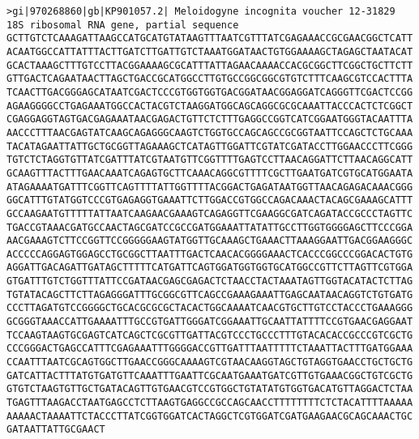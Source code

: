 \documentclass[11pt]{article}
\begin{document}
\begin{Verbatim}[commandchars=\\\{\}]
>gi|970268860|gb|KP901057.2| Meloidogyne incognita voucher 12-31829 18S ribosomal RNA gene, partial sequence
GCTTGTCTCAAAGATTAAGCCATGCATGTATAAGTTTAATCGTTTATCGAGAAACCGCGAACGGCTCATT
ACAATGGCCATTATTTACTTGATCTTGATTGTCTAAATGGATAACTGTGGAAAAGCTAGAGCTAATACAT
GCACTAAAGCTTTGTCCTTACGGAAAAGCGCATTTATTAGAACAAAACCACGCGGCTTCGGCTGCTTCTT
GTTGACTCAGAATAACTTAGCTGACCGCATGGCCTTGTGCCGGCGGCGTGTCTTTCAAGCGTCCACTTTA
TCAACTTGACGGGAGCATAATCGACTCCCGTGGTGGTGACGGATAACGGAGGATCAGGGTTCGACTCCGG
AGAAGGGGCCTGAGAAATGGCCACTACGTCTAAGGATGGCAGCAGGCGCGCAAATTACCCACTCTCGGCT
CGAGGAGGTAGTGACGAGAAATAACGAGACTGTTCTCTTTGAGGCCGGTCATCGGAATGGGTACAATTTA
AACCCTTTAACGAGTATCAAGCAGAGGGCAAGTCTGGTGCCAGCAGCCGCGGTAATTCCAGCTCTGCAAA
TACATAGAATTATTGCTGCGGTTAGAAAGCTCATAGTTGGATTCGTATCGATACCTTGGAACCCTTCGGG
TGTCTCTAGGTGTTATCGATTTATCGTAATGTTCGGTTTTGAGTCCTTAACAGGATTCTTAACAGGCATT
GCAAGTTTACTTTGAACAAATCAGAGTGCTTCAAACAGGCGTTTTCGCTTGAATGATCGTGCATGGAATA
ATAGAAAATGATTTCGGTTCAGTTTTATTGGTTTTACGGACTGAGATAATGGTTAACAGAGACAAACGGG
GGCATTTGTATGGTCCCGTGAGAGGTGAAATTCTTGGACCGTGGCCAGACAAACTACAGCGAAAGCATTT
GCCAAGAATGTTTTTATTAATCAAGAACGAAAGTCAGAGGTTCGAAGGCGATCAGATACCGCCCTAGTTC
TGACCGTAAACGATGCCAACTAGCGATCCGCCGATGGAAATTATATTGCCTTGGTGGGGAGCTTCCCGGA
AACGAAAGTCTTCCGGTTCCGGGGGAAGTATGGTTGCAAAGCTGAAACTTAAAGGAATTGACGGAAGGGC
ACCCCCAGGAGTGGAGCCTGCGGCTTAATTTGACTCAACACGGGGAAACTCACCCGGCCCGGACACTGTG
AGGATTGACAGATTGATAGCTTTTTCATGATTCAGTGGATGGTGGTGCATGGCCGTTCTTAGTTCGTGGA
GTGATTTGTCTGGTTTATTCCGATAACGAGCGAGACTCTAACCTACTAAATAGTTGGTACATACTCTTAG
TGTATACAGCTTCTTAGAGGGATTTGCGGCGTTCAGCCGAAAGAAATTGAGCAATAACAGGTCTGTGATG
CCCTTAGATGTCCGGGGCTGCACGCGCGCTACACTGGCAAAATCAACGTGCTTGTCCTACCCTGAAAGGG
GCGGGTAAACCATTGAAAATTTGCCGTGATTGGGATCGGAAATTGCAATTATTTTCCGTGAACGAGGAAT
TCCAAGTAAGTGCGAGTCATCAGCTCGCGTTGATTACGTCCCTGCCCTTTGTACACACCGCCCGTCGCTG
CCCGGGACTGAGCCATTTCGAGAAATTTGGGGACCGTTGATTTAATTTTTCTAAATTACTTTGATGGAAA
CCAATTTAATCGCAGTGGCTTGAACCGGGCAAAAGTCGTAACAAGGTAGCTGTAGGTGAACCTGCTGCTG
GATCATTACTTTATGTGATGTTCAAATTTGAATTCGCAATGAAATGATCGTTGTGAAACGGCTGTCGCTG
GTGTCTAAGTGTTGCTGATACAGTTGTGAACGTCCGTGGCTGTATATGTGGTGACATGTTAGGACTCTAA
TGAGTTTAAGACCTAATGAGCCTCTTAAGTGAGGCCGCCAGCAACCTTTTTTTTCTCTACATTTTAAAAA
AAAAACTAAAATTCTACCCTTATCGGTGGATCACTAGGCTCGTGGATCGATGAAGAACGCAGCAAACTGC
GATAATTATTGCGAACT


\end{Verbatim}
\end{document}
